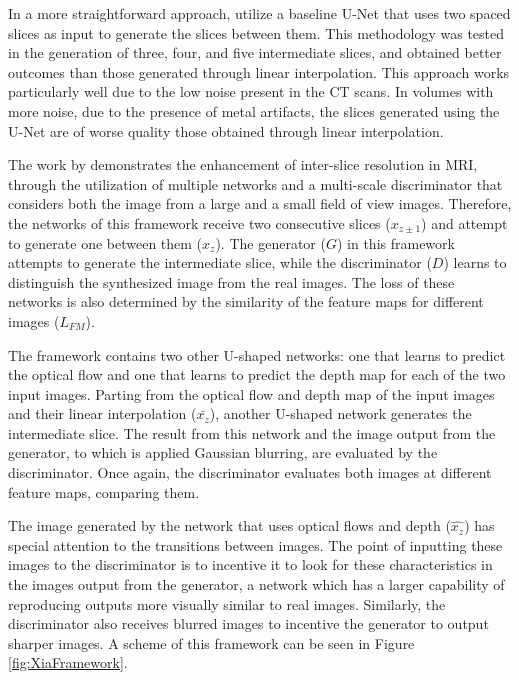 In a more straightforward approach, \textcite{Nishimoto2024} utilize a baseline U-Net that uses two spaced slices as input to generate the slices between them. This methodology was tested in the generation of three, four, and five intermediate slices, and obtained better outcomes than those generated through linear interpolation. This approach works particularly well due to the low noise present in the CT scans. In volumes with more noise, due to the presence of metal artifacts, the slices generated using the U-Net are of worse quality those obtained through linear interpolation.
\par
The work by \textcite{Xia2021} demonstrates the enhancement of inter-slice resolution in MRI, through the utilization of multiple networks and a multi-scale discriminator that considers both the image from a large and a small field of view images. Therefore, the networks of this framework receive two consecutive slices ($x_{z\pm1}$) and attempt to generate one between them ($x_{z}$). The generator ($G$) in this framework attempts to generate the intermediate slice, while the discriminator ($D$) learns to distinguish the synthesized image from the real images. The loss of these networks is also determined by the similarity of the feature maps for different images ($L_{FM}$).
\par
The framework contains two other U-shaped networks: one that learns to predict the optical flow and one that learns to predict the depth map for each of the two input images. Parting from the optical flow and depth map of the input images and their linear interpolation ($\bar{x_{z}}$), another U-shaped network generates the intermediate slice. The result from this network and the image output from the generator, to which is applied Gaussian blurring, are evaluated by the discriminator. Once again, the discriminator evaluates both images at different feature maps, comparing them.
\par
The image generated by the network that uses optical flows and depth ($\hat{x_{z}}$) has special attention to the transitions between images. The point of inputting these images to the discriminator is to incentive it to look for these characteristics in the images output from the generator, a network which has a larger capability of reproducing outputs more visually similar to real images. Similarly, the discriminator also receives blurred images to incentive the generator to output sharper images. A scheme of this framework can be seen in Figure \ref{fig:XiaFramework}.

